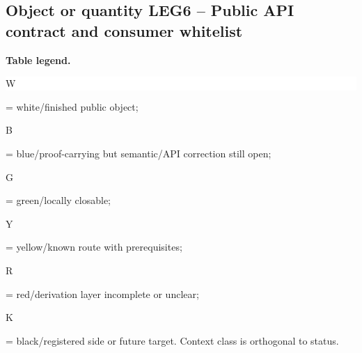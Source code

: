 \subsection*{Object or quantity LEG6 -- Public API contract and consumer whitelist}
\hypertarget{objproof:LEG6}{}
\par\smallskip\noindent\begin{minipage}{0.99\linewidth}\footnotesize\raggedright\textbf{Table legend.} \colorbox{white}{\strut W} = white/finished public object; \colorbox{cyan!20}{\strut B} = blue/proof-carrying but semantic/API correction still open; \colorbox{green!18}{\strut G} = green/locally closable; \colorbox{yellow!25}{\strut Y} = yellow/known route with prerequisites; \colorbox{red!20}{\strut R} = red/derivation layer incomplete or unclear; \colorbox{black!18}{\strut K} = black/registered side or future target. Context class is orthogonal to status.\end{minipage}\par\vspace{0.25em}
